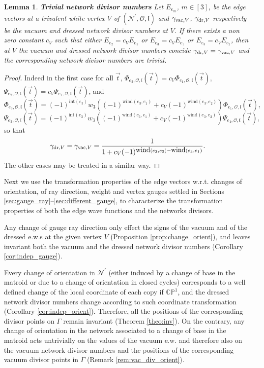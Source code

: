 \documentclass[11pt]{amsart}
\theoremstyle{plain}
\numberwithin{equation}{section}
\newtheorem{lemma}[theorem]{Lemma}
\begin{document}
\begin{lemma}\label{lemma:trivial_div}\textbf{Trivial network divisor numbers}
Let $E_{e_m}$, $m\in [3]$, be the edge vectors at a trivalent white vertex $V$ of $({\mathcal N}^{\prime},\mathcal O,\mathfrak l)$ and $\gamma_{\textup{\scriptsize vac},V}$, $\gamma_{\textup{\scriptsize dr},V}$ respectively be the vacuum and dressed network divisor numbers at $V$. If there exists a non zero constant $c_V$ such that either $E_{e_2} = c_V E_{e_1}$ or $E_{e_3} = c_V E_{e_1}$ or $E_{e_3} = c_V E_{e_2}$, then at $V$ the vacuum and dressed network divisor numbers concide
$\gamma_{\textup{\scriptsize dr},V} = \gamma_{\textup{\scriptsize vac},V}$
and the corresponding network divisor numbers are trivial.
\end{lemma}

\begin{proof}
Indeed in the first case for all $\vec t$,
$\Phi_{e_2,\mathcal O,\mathfrak l} (\vec t) =c_V\Phi_{e_1,\mathcal O,\mathfrak l} (\vec t)$, $\Psi_{e_2,\mathcal O,\mathfrak l} (\vec t) =c_V\Psi_{e_1,\mathcal O,\mathfrak l} (\vec t)$,
and 
\[
\Phi_{e_3,\mathcal O,\mathfrak l} (\vec t) =(-1)^{\mbox{int}(e_3)} w_3\left( (-1)^{\mbox{wind}(e_3, e_1)}+c_V(-1)^{\mbox{wind}(e_3, e_2)}\right) \Phi_{e_1,\mathcal O,\mathfrak l} (\vec t),\]
\[ 
\Psi_{e_3,\mathcal O,\mathfrak l} (\vec t) =(-1)^{\mbox{int}(e_3)} w_3\left( (-1)^{\mbox{wind}(e_3, e_1)}+c_V(-1)^{\mbox{wind}(e_3, e_2)}\right) \Psi_{e_1,\mathcal O,\mathfrak l} (\vec t),
\]
so that
\[
\gamma_{\textup{\scriptsize dr},V} = \gamma_{\textup{\scriptsize vac},V} = \frac{1}{1+c_V(-1)^{\mbox{wind}(e_3, e_2)-\mbox{wind}(e_3, e_1)}}.
\]
The other cases may be treated in a similar way.
\end{proof}

Next we use the transformation properties of the edge vectors w.r.t. changes of orientation, of ray direction, weight and vertex gauges settled in Sections \ref{sec:gauge_ray}--\ref{sec:different_gauge}, to characterize the transformation properties of both the edge wave functions and the networks divisors.

Any change of gauge ray direction only effect the signs of the vacuum and of the dressed e.w.s at the given vertex $V$ 
(Proposition \ref{prop:change_orient}), and leaves invariant both the vacuum and the dressed network divisor numbers (Corollary \ref{cor:indep_gauge}).

Every change of orientation in ${\mathcal N}^{\prime}$ (either induced by a change of base in the matroid or due to a change of orientation in closed cycles) corresponds to a well defined change of the local coordinate of each copy if $\mathbb{CP}^1$, and the dressed network divisor numbers 
change according to such coordinate transformation (Corollary \ref{cor:indep_orient}). Therefore, all the positions of the corresponding divisor 
points on $\Gamma$ remain invariant (Theorem \ref{theo:inv}).
On the contrary, any change of orientation in the network associated to a change of base in the matroid acts untrivially on the values of the vacuum e.w. and therefore also on the vacuum network divisor numbers and the positions of the corresponding vacuum divisor points in $\Gamma$ (Remark \ref{rem:vac_div_orient}).
\end{document}
